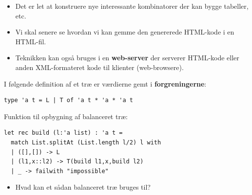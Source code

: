 \documentclass[rgb]{beamer}
\begin{document}
\begin{frame}[fragile]
\begin{footnotesize}
\vspace{1ex}

  \vspace{1ex}
  \begin{itemize}
  \item Det er let at konstruere nye interessante kombinatorer der kan bygge tabeller, etc.
  \item Vi skal senere se hvordan vi kan gemme den genererede HTML-kode i en HTML-fil.
  \item Teknikken kan også bruges i en \textbf{web-server} der serverer HTML-kode eller anden XML-formateret kode til klienter (web-browsere).
  \end{itemize}

\end{footnotesize}
\end{frame}

\begin{frame}[fragile]
\begin{footnotesize}

  \vspace{1ex}

  I følgende definition af et træ er værdierne gemt i \textbf{forgreningerne}:

  \vspace{1ex}

\begin{lstlisting}[numbers=none,frame=none,mathescape]
type 'a t = L | T of 'a t * 'a * 'a t
\end{lstlisting}
  \vspace{1ex}

Funktion til opbygning af balanceret træ:
  \vspace{1ex}
\begin{lstlisting}[numbers=none,frame=none,mathescape]
let rec build (l:'a list) : 'a t =
  match List.splitAt (List.length l/2) l with
  | ([],[]) -> L
  | (l1,x::l2) -> T(build l1,x,build l2)
  | _ -> failwith "impossible"
\end{lstlisting}

  \vspace{1ex}

  \vspace{1ex}
  \begin{itemize}
  \item Hvad kan et sådan balanceret træ bruges til?
  \end{itemize}

\end{footnotesize}
\end{frame}
\end{document}
